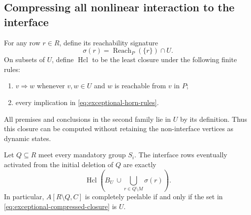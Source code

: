 \subsection{Compressing all nonlinear interaction to the interface}
\label{subsec:exceptional-compression}

For any row $r\in R$, define its reachability signature
\begin{equation}
                   \sigma(r)=\operatorname{Reach}_P(\{r\})\cap U.
                   \label{eq:exceptional-signature}
\end{equation}
On subsets of $U$, define $\operatorname{Hcl}$ to be the least closure
under the following finite rules:
\begin{enumerate}
\item $v\Longrightarrow w$ whenever $v,w\in U$ and $w$ is reachable
      from $v$ in $P$;
\item every implication in \eqref{eq:exceptional-horn-rules}.
\end{enumerate}
All premises and conclusions in the second family lie in $U$ by its
definition.  Thus this closure can be computed without retaining the
non-interface vertices as dynamic states.

\begin{lemma}
\label{lem:exceptional-compressed}
Let $Q\subseteq R$ meet every mandatory group $S_i$.  The interface rows
eventually activated from the initial deletion of $Q$ are exactly
\begin{equation}
  \operatorname{Hcl}\left(
        B_U\ \cup\!\bigcup_{r\in Q\setminus M}\sigma(r)
                      \right).
  \label{eq:exceptional-compressed-closure}
\end{equation}
In particular, $A[R\setminus Q,C]$ is completely peelable if and only if
the set in \eqref{eq:exceptional-compressed-closure} is $U$.
\end{lemma}

